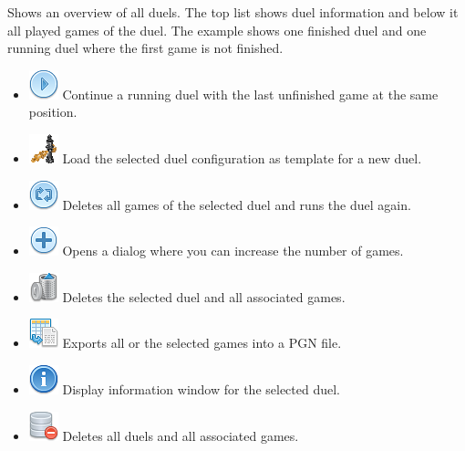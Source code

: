 \documentclass[11pt,a4paper]{article}
\begin{document}
Shows an overview of all duels. The top list shows duel information and below it all played games of the duel. The example shows one finished duel and one running duel where the first game is not finished.

\begin{itemize}
	\item \includegraphics[scale=0.5]{control_play_blue.png} Continue a running duel with the last unfinished game at the same position.
	\item \includegraphics[scale=0.5]{6-2-chess-png.png} Load the selected duel configuration as template for a new duel.
	\item \includegraphics[scale=0.5]{control_repeat_blue.png} Deletes all games of the selected duel and runs the duel again.
    \item \includegraphics[scale=0.5]{plus_light_blue.png} Opens a dialog where you can increase the number of games.	
    \item \includegraphics[scale=0.5]{bin.png} Deletes the selected duel and all associated games.
	\item \includegraphics[scale=0.5]{text_exports.png} Exports all or the selected games into a PGN file.    
	\item \includegraphics[scale=0.5]{information.png} Display information window for the selected duel.    	
    \item \includegraphics[scale=0.5]{database_delete.png} Deletes all duels and all associated games.
\end{itemize}
\end{document}
